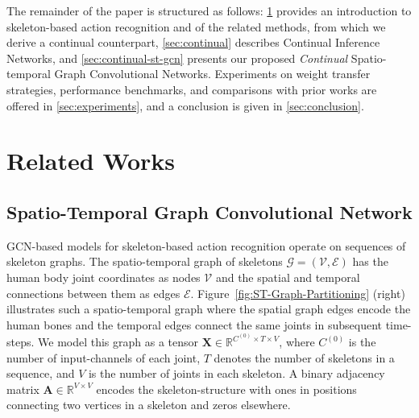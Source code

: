\documentclass[journal]{IEEEtran}
\theoremstyle{definition}
\begin{document}
The remainder of the paper is structured as follows: \cref{sec:related-work} provides an introduction to skeleton-based action recognition and of the related methods, from which we derive a continual counterpart, \cref{sec:continual} describes Continual Inference Networks, and \cref{sec:continual-st-gcn} presents our proposed \textit{Continual} Spatio-temporal Graph Convolutional Networks. Experiments on weight transfer strategies, performance benchmarks, and comparisons with prior works are offered in \cref{sec:experiments}, and a conclusion is given in \cref{sec:conclusion}.




\section{Related Works} \label{sec:related-work}
\subsection{Spatio-Temporal Graph Convolutional Network}\label{sec:gcn}
GCN-based models for skeleton-based action recognition \cite{yan2018spatial,heidari2021progressive,negarTAGCN} operate on sequences of skeleton graphs. 
The spatio-temporal graph of skeletons $\mathcal{G} = (\mathcal{V}, \mathcal{E})$ has the human body joint coordinates as nodes $\mathcal{V}$ and the spatial and temporal connections between them as edges $\mathcal{E}$. 
Figure~\ref{fig:ST-Graph-Partitioning} (right) illustrates such a spatio-temporal graph where the spatial graph edges encode the human bones and the temporal edges connect the same joints in subsequent time-steps.
We model this graph as a tensor $\mathbf{X} \in \mathbb{R}^{C^{(0)} \times T \times V}$, where $C^{(0)}$ is the number of input-channels of each joint, $T$ denotes the number of skeletons in a sequence, and $V$ is the number of joints in each skeleton. A binary adjacency matrix $\mathbf{A} \in \mathbb{R}^{V \times V}$ encodes the skeleton-structure with ones in positions connecting two vertices in a skeleton and zeros elsewhere.
\end{document}
